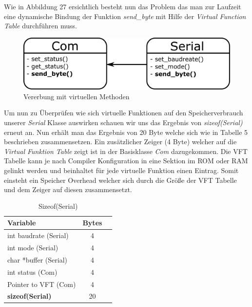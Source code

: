 \documentclass[MES,Master,ngerman]{twbook}%
\begin{document}
Wie in Abbildung 27 ersichtlich besteht nun das Problem das man zur Laufzeit eine dynamische Bindung der Funktion \textit{send\_byte} mit Hilfe der \textit{Virtual Function Table} durchführen muss. 

\begin{figure}[h]
	\centering
	\includegraphics[scale=0.65]{../Grafiken/Virtuelle_Funktionen.png}
	\caption{Vererbung mit virtuellen Methoden}
	\label{fig:35}
\end{figure}

Um nun zu Überprüfen wie sich virtuelle Funktionen auf den Speicherverbrauch unserer \textit{Serial} Klasse auswirken schauen wir uns das Ergebnis von \textit{sizeof(Serial)} erneut an. Nun erhält man das Ergebnis von 20 Byte welche sich wie in Tabelle 5 beschrieben zusammensetzen. Ein zusätzlicher Zeiger (4 Byte) welcher auf die \textit{Virtual Funktion Table} zeigt ist in der Basisklasse \textit{Com} dazugekommen. Die VFT Tabelle kann je nach Compiler Konfiguration in eine Sektion im ROM oder RAM gelinkt werden und beinhaltet für jede virtuelle Funktion einen Eintrag. Somit einsteht ein Speicher Overhead welcher sich durch die Größe der VFT Tabelle und dem Zeiger auf diesen zusammensetzt. 

\begin{table}[!htb]
	\centering
	\begin{tabular}{| l | c | r |}
		\hline
		\textbf{Variable}   & \textbf{Bytes}    \\ \hline
		int baudrate (Serial)        & 4				    \\ \hline
		int mode (Serial)            & 4 	    		\\ \hline
		char *buffer (Serial)       & 4		            \\ \hline
		int status (Com)       & 4  			    \\ \hline
		Pointer to VFT (Com)       & 4  			    \\ \hline
		\textbf{sizeof(Serial)} & 20 \\ \hline
		
		
	\end{tabular}
	
	\caption{Sizeof(Serial)}
	\label{tbl:5}
\end{table}
\end{document}
